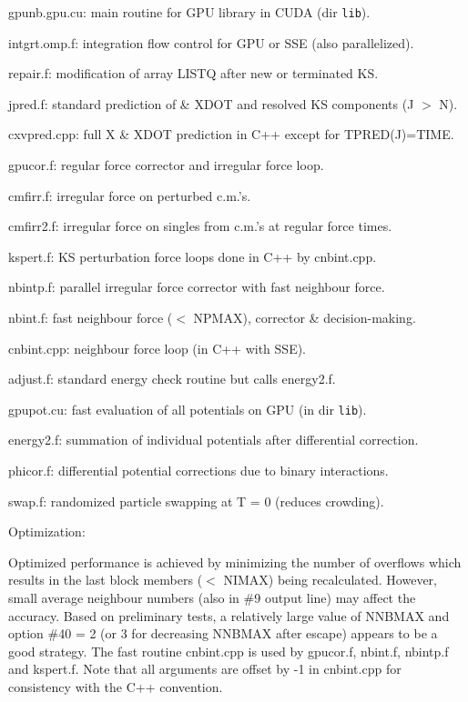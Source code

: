 \documentclass[12pt]{article}
\begin{document}
\medskip
\noindent
gpunb.gpu.cu: main routine for GPU library in CUDA (dir {\tt lib}).

\medskip
\noindent
intgrt.omp.f: integration flow control for GPU or SSE (also parallelized).

\medskip
\noindent
repair.f: modification of array LISTQ after new or terminated KS.

\medskip
\noindent
jpred.f: standard prediction of \& XDOT and resolved KS components (J $>$ N).

\medskip
\noindent
cxvpred.cpp: full X \& XDOT prediction in C++ except for TPRED(J)=TIME.

\medskip
\noindent
gpucor.f: regular force corrector and irregular force loop.

\medskip
\noindent
cmfirr.f: irregular force on perturbed c.m.'s.

\medskip
\noindent
cmfirr2.f: irregular force on singles from c.m.'s at regular force times.

\medskip
\noindent
kspert.f: KS perturbation force loops done in C++ by cnbint.cpp.

\medskip
\noindent
nbintp.f: parallel irregular force corrector with fast neighbour force.

\medskip
\noindent
nbint.f: fast neighbour force ($<$ NPMAX), corrector \& decision-making.

\medskip
\noindent
cnbint.cpp: neighbour force loop (in C++ with SSE).

\medskip
\noindent
adjust.f: standard energy check routine but calls energy2.f.

\medskip
\noindent
gpupot.cu: fast evaluation of all potentials on GPU (in dir {\tt lib}).

\medskip
\noindent
energy2.f: summation of individual potentials after differential correction.

\medskip
\noindent
phicor.f: differential potential corrections due to binary interactions.

\medskip
\noindent
swap.f: randomized particle swapping at T = 0 (reduces crowding).

\medskip
\medskip
\noindent
Optimization:

\medskip
Optimized performance is achieved by minimizing the number of overflows
which results in the last block members ($<$ NIMAX) being recalculated.
However, small average neighbour numbers (also in \#9 output line) may affect
the accuracy. Based on preliminary tests, a relatively large value of
NNBMAX and option \#40 = 2 (or 3 for decreasing NNBMAX after escape)
appears to be a good strategy.
The fast routine cnbint.cpp is used by gpucor.f, nbint.f, nbintp.f and kspert.f.
Note that all arguments are offset by -1 in cnbint.cpp for consistency with
the C++ convention.
\end{document}

